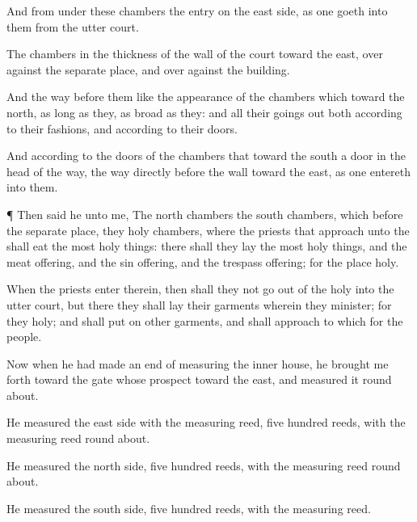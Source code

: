 {And from under these
chambers
{} the
entry on the east
side, as one
goeth into
them from the
utter
court.

The
chambers
{} in the
thickness of the
wall of the
court
toward the
east, over
against the separate
place, and over
against the
building.

And the
way
before them
{} like the
appearance of the
chambers which
{}
toward the
north, as long
as they,
{} as broad
as they: and all their goings
out
{} both according to their
fashions, and according to their
doors.

And according to the
doors of the
chambers that
{}
toward the
south
{} a
door in the
head of the
way,
{} the
way
directly
before the
wall
toward the
east, as one
entereth into them.


\par }{\PP {}¶ Then
said he unto me, The
north
chambers
{} the
south
chambers, which
{}
before the separate
place, they
{}
holy
chambers, where the
priests that
approach unto the
{} shall
eat the
most holy
things: there shall they
lay the
most holy
things, and the meat
offering, and the sin
offering, and the trespass
offering; for the
place
{}
holy.

When the
priests
enter therein, then shall they not go
out of the
holy
{} into the
utter
court, but there they shall
lay their
garments wherein they
minister; for they
{}
holy; and shall
put on
other
garments, and shall
approach to
{} which
{} for the
people.


\par }{\PP {}Now when he had made an
end of
measuring the
inner
house, he brought me
forth
toward the
gate whose
prospect
{}
toward the
east, and
measured it round
about.

He
measured the
east
side with the
measuring
reed,
five
hundred
reeds, with the
measuring
reed round
about.

He
measured the
north
side,
five
hundred
reeds, with the
measuring
reed round
about.

He
measured the
south
side,
five
hundred
reeds, with the
measuring
reed.


}
